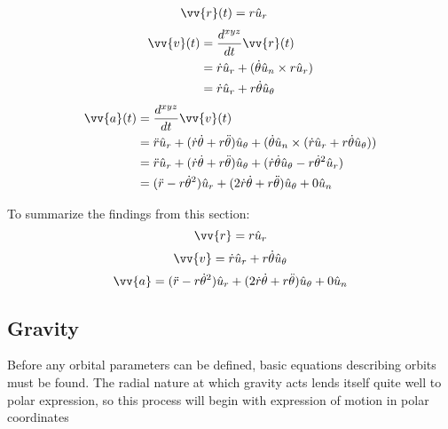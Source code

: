 \documentclass[../basicOrbitalDynamics.tex]{subfiles}
\begin{document}
\begin{align*}
    \vv{r}(t) & =r\hat{u}_r
\end{align*}
\begin{align*}
    \vv{v}(t) & =\frac{d^{xyz}}{dt}\vv{r}(t)                                \\
              & =\dot{r}\hat{u}_r+(\dot{\theta}\hat{u}_n\times{}r\hat{u}_r) \\
              & =\dot{r}\hat{u}_r+r\dot{\theta}\hat{u}_\theta
\end{align*}
\begin{align*}
    \vv{a}(t) & =\frac{d^{xyz}}{dt}\vv{v}(t)                                                                                                                      \\
              & =\ddot{r}\hat{u}_r+(\dot{r}\dot{\theta}+r\ddot{\theta})\hat{u}_\theta+(\dot{\theta}\hat{u}_n\times(\dot{r}\hat{u}_r+r\dot{\theta}\hat{u}_\theta)) \\
              & =\ddot{r}\hat{u}_r+(\dot{r}\dot{\theta}+r\ddot{\theta})\hat{u}_\theta+(\dot{r}\dot{\theta}\hat{u}_\theta-r\dot{\theta}^2\hat{u}_r)                \\
              & =(\ddot{r}-r\dot{\theta}^2)\hat{u}_r+(2\dot{r}\dot{\theta}+r\ddot{\theta})\hat{u}_\theta+0\hat{u}_n                                               \\
\end{align*}

To summarize the findings from this section:
\begin{equation}\label{Position}
    \vv{r}=r\hat{u}_r
\end{equation}
\begin{equation}\label{Velocity}
    \vv{v}=\dot{r}\hat{u}_r+r\dot{\theta}\hat{u}_\theta
\end{equation}
\begin{equation}\label{Acceleration}
    \vv{a}=(\ddot{r}-r\dot{\theta}^2)\hat{u}_r+(2\dot{r}\dot{\theta}+r\ddot{\theta})\hat{u}_\theta+0\hat{u}_n
\end{equation}

\bigskip\bigskip
\subsection{Gravity}

Before any orbital parameters can be defined, basic equations describing orbits must be found. The radial nature at which gravity acts lends itself quite well to polar expression, so this process will begin with expression of motion in polar coordinates
\end{document}
